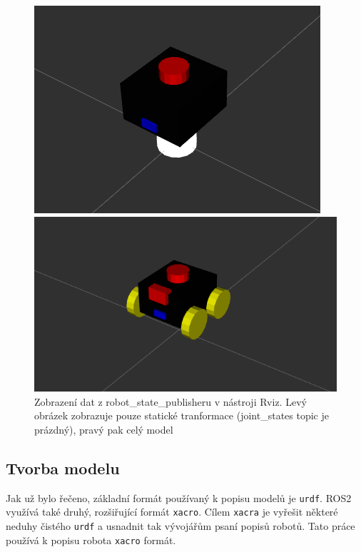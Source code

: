 \begin{figure}[h!]
	\centering
	\begin{minipage}[c]{0.45\textwidth}
		\centering
		\includegraphics[scale=0.45]{obrazky-figures/robot_description_no_joint_states.png}
	\end{minipage}%
	\begin{minipage}[c]{0.55\textwidth}
		\centering
		\includegraphics[scale=0.4]{obrazky-figures/robot_description_joint_states.png}
	\end{minipage}
	\caption[Zobrazení popisu robota v nástroji Rviz]{Zobrazení dat z robot\_state\_publisheru v nástroji Rviz. Levý obrázek zobrazuje pouze statické tranformace (joint\_states topic je prázdný), pravý pak celý model}
	\label{fig:rviz_robot_desc}
\end{figure}

\subsection*{Tvorba modelu}
Jak už bylo řečeno, základní formát používaný k popisu modelů je \verb|urdf|. ROS2 využívá také druhý, rozšiřující formát \verb|xacro|. Cílem \verb|xacra| je vyřešit některé neduhy čistého \verb|urdf| a usnadnit tak vývojářům psaní popisů robotů. Tato práce používá k popisu robota \verb|xacro| formát.


